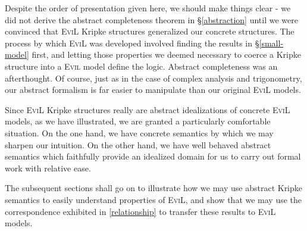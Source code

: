 Despite the order of presentation given here, we should make things
clear - we did not derive the abstract completeness theorem in
\S\ref{abstraction} until we were convinced that \textsc{EviL} Kripke
structures generalized our concrete structures.  The process by which
\textsc{EviL} was developed involved finding the results in
\S\ref{small-model} first, and letting those properties we deemed 
necessary to coerce a Kripke structure into a \textsc{Evil} 
model define the logic.  
Abstract completeness was an afterthought.  Of course, just as in the
case of complex analysis and trigonometry, our abstract formalism
is far easier to manipulate than our original \textsc{EviL} models.

Since \textsc{EviL} Kripke structures really are abstract
idealizations of concrete \textsc{EviL} models, as we have
illustrated, we are granted a particularly comfortable situation.  
On the one hand, we have concrete semantics by
which we may sharpen our intuition. On the other hand, we 
have well behaved abstract semantics which faithfully provide an 
idealized domain for us to carry out formal work with relative ease.

The subsequent sections shall go on to illustrate how we may use
abstract Kripke semantics to easily understand properties of
\textsc{EviL}, and show that we may use the correspondence exhibited
in \eqref{relationship} to transfer these results to \textsc{EviL} models.

